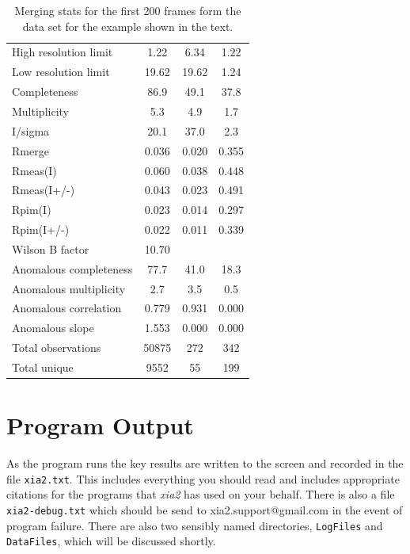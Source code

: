 \documentclass[a4paper, 11pt]{article}
\begin{document}
\begin{table}
\caption{Merging stats for the first 200 frames form the data set for
  the example shown in the text.\label{table-merging-sub}}
\begin{tabular}{lccc}
High resolution limit         &         1.22 &  6.34 &  1.22 \\
Low resolution limit          &        19.62 & 19.62 &  1.24 \\
Completeness                  &         86.9 &  49.1 &  37.8 \\
Multiplicity                  &        5.3  &  4.9   & 1.7 \\
I/sigma                       &        20.1 &  37.0  &  2.3 \\
Rmerge                        &       0.036 & 0.020  &0.355 \\
Rmeas(I)                      &       0.060 & 0.038  &0.448 \\
Rmeas(I+/-)                   &       0.043 & 0.023  &0.491 \\
Rpim(I)                       &       0.023 & 0.014  &0.297 \\
Rpim(I+/-)                    &       0.022 & 0.011  &0.339 \\
Wilson B factor               &       10.70& \\
Anomalous completeness        &        77.7  & 41.0  & 18.3 \\
Anomalous multiplicity        &         2.7  &  3.5  &  0.5 \\
Anomalous correlation         &        0.779 & 0.931 & 0.000 \\
Anomalous slope               &       1.553  &0.000 & 0.000 \\
Total observations            &       50875  &272   & 342 \\
Total unique                  &       9552   &55    & 199 \\
\end{tabular}
\end{table}

\section{Program Output}

As the program runs the key results are written to the screen and recorded
in the file \verb|xia2.txt|. This includes everything you should read and
includes appropriate citations for the programs that \emph{xia2} has used
on your behalf. There is also a file \verb|xia2-debug.txt| 
which should be send to 
xia2.support@gmail.com in the event of program failure. There are also two 
sensibly named directories, \verb|LogFiles| and \verb|DataFiles|, which will
be discussed shortly.
\end{document}
